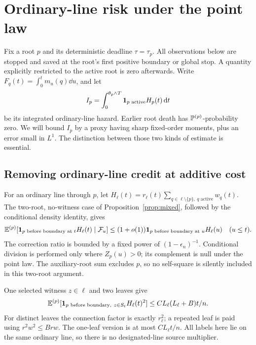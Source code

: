 \section{Ordinary-line risk under the point law}\label{sec:riskproof}

Fix a root \(p\) and its deterministic deadline \(\tau=\tau_p\).
All observations below are stopped and saved at the root's first
positive boundary or global stop. A quantity explicitly restricted
to the active root is zero afterwards. Write
\(F_q(t)=\int_0^t m_u(q)\dd u\), and let
\[
 I_p=\int_0^{\theta_p\wedge T}\mathbf 1_{p\text{ active}}H_p(t)\,\mathrm d t
\]
be its integrated ordinary-line hazard. Earlier root death has
\(\mathbb P^{(p)}\)-probability zero. We will bound \(I_p\) by a proxy
having sharp fixed-order moments, plus an error small in \(L^1\).
The distinction between those two kinds of estimate is essential.

\subsection{Removing ordinary-line credit at additive cost}
For an ordinary line through \(p\), let
\(H_\ell(t)=r_\ell(t)\sum_{q\in\ell\setminus\{p\},\ q\text{ active}}w_q(t)\).
The two-root, no-witness case of Proposition~\ref{prop:mixed}, followed
by the conditional density identity, gives
\begin{equation}\label{eq:conditionalH}
 \mathbb E^{(p)}[\mathbf 1_{p\text{ before boundary at }t}H_\ell(t)\mid\mathcal F_u]
 \le(1+o(1))\mathbf 1_{p\text{ before boundary at }u}H_\ell(u)
 \quad(u\le t).
\end{equation}
The correction ratio is bounded by a fixed power of
\((1-\epsilon_n)^{-1}\). Conditional division is performed only
where \(Z_p(u)>0\); its complement is null under the point law.
The auxiliary-root sum excludes \(p\), so no self-square is
silently included in this two-root argument.

One selected witness \(z\in\ell\) and two leaves give
\begin{equation}\label{eq:secondH}
 \mathbb E^{(p)}[\mathbf 1_{p\text{ before boundary},\ z\in S_t}H_\ell(t)^2]
 \le C L_\ell(L_\ell+B)t/n.
\end{equation}
For distinct leaves the connection factor is exactly \(r_\ell^2\);
a repeated leaf is paid using \(r^2w^2\le Brw\).
The one-leaf version is at most \(CL_\ell t/n\).
All labels here lie on the same ordinary line, so there is no
designated-line source multiplier.

